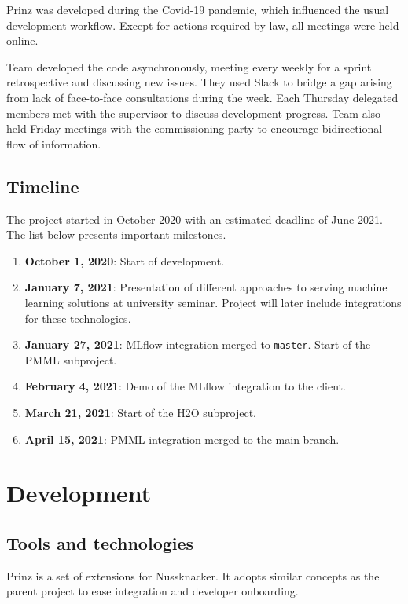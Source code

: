 Prinz was developed during the Covid-19 pandemic, which influenced the usual development workflow.
Except for actions required by law, all meetings were held online.

Team developed the code asynchronously, meeting every weekly for a sprint retrospective and discussing new issues.
They used Slack to bridge a gap arising from lack of face-to-face consultations during the week.
Each Thursday delegated members met with the supervisor to discuss development progress.
Team also held Friday meetings with the commissioning party to encourage bidirectional flow of information.

\subsection{Timeline}

The project started in October 2020 with an estimated deadline of June 2021.
The list below presents important milestones.
\begin{enumerate}
  \item \textbf{October 1, 2020}: Start of development.
  \item \textbf{January 7, 2021}: Presentation of different approaches to serving machine learning solutions at university seminar. Project will later include integrations for these technologies.
  \item \textbf{January 27, 2021}: MLflow integration merged to \texttt{master}. Start of the PMML subproject.
  \item \textbf{February 4, 2021}: Demo of the MLflow integration to the client.
  \item \textbf{March 21, 2021}: Start of the H2O subproject.
  \item \textbf{April 15, 2021}: PMML integration merged to the main branch.
\end{enumerate}

\section{Development}

\subsection{Tools and technologies}

Prinz is a set of extensions for Nussknacker.
It adopts similar concepts as the parent project to ease integration and developer onboarding.

